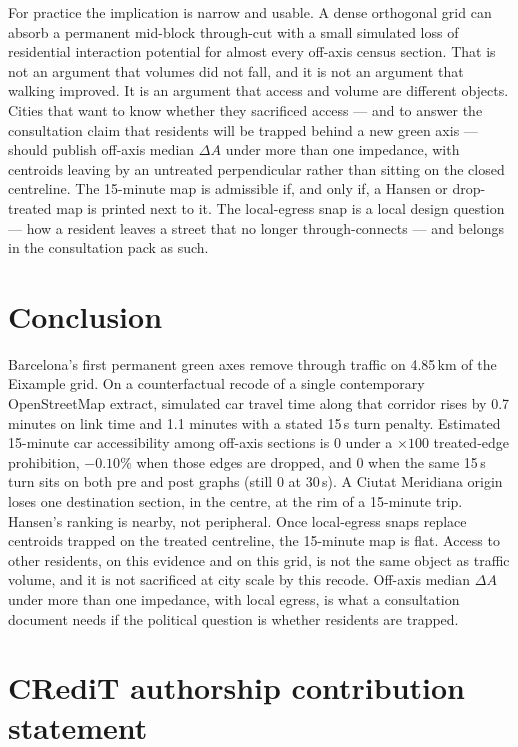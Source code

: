 \documentclass[a4paper,fleqn]{cas-dc}
\begin{document}
For practice the implication is narrow and usable. A dense orthogonal grid
can absorb a permanent mid-block through-cut with a small simulated loss of
residential interaction potential for almost every off-axis census section.
That is not an argument that volumes did not fall, and it is not an
argument that walking improved. It is an argument that access and volume
are different objects. Cities that want to know whether they sacrificed
access --- and to answer the consultation claim that residents will be
trapped behind a new green axis --- should publish off-axis median
$\Delta A$ under more than one impedance, with centroids leaving by an
untreated perpendicular rather than sitting on the closed centreline. The
15-minute map is admissible if, and only if, a Hansen or drop-treated map
is printed next to it. The local-egress snap is a local design question
--- how a resident leaves a street that no longer through-connects ---
and belongs in the consultation pack as such.

\section{Conclusion}
\label{sec:conc}

Barcelona's first permanent green axes remove through traffic on 4.85\,km of
the Eixample grid. On a counterfactual recode of a single contemporary
OpenStreetMap extract, simulated car travel time along that corridor rises by
0.7 minutes on link time and 1.1 minutes with a stated 15\,s turn penalty.
Estimated 15-minute car accessibility among off-axis sections is $0$ under
a $\times 100$ treated-edge prohibition, $-0.10\%$ when those edges are
dropped, and $0$ when the same 15\,s turn sits on both pre and post graphs
(still $0$ at 30\,s).
A Ciutat Meridiana origin loses one destination section, in the centre, at
the rim of a 15-minute trip. Hansen's ranking is nearby, not peripheral.
Once local-egress snaps replace centroids trapped on the treated
centreline, the 15-minute map is flat. Access to other residents, on this
evidence and on this grid, is not the same object as traffic volume, and it
is not sacrificed at city scale by this recode. Off-axis median $\Delta A$
under more than one impedance, with local egress, is what a consultation
document needs if the political question is whether residents are trapped.

\section*{CRediT authorship contribution statement}
\end{document}
